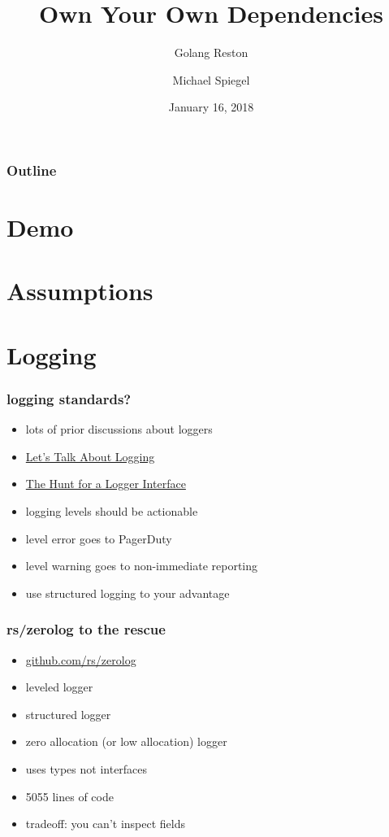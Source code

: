 \documentclass{beamer}
\title{Own Your Own Dependencies}
\subtitle{Golang Reston}
\author{Michael Spiegel}
\date{January 16, 2018}
\begin{document}
\begin{frame}
\titlepage
\end{frame}

\begin{frame}
\frametitle{Outline}
\tableofcontents
\end{frame}

\section{Demo}
\section{Assumptions}
\section{Logging}

\begin{frame}
\frametitle{logging standards?}
\begin{itemize}
\item lots of prior discussions about loggers
\item \href{https://dave.cheney.net/2015/11/05/lets-talk-about-logging}{Let's Talk About Logging}
\item \href{https://go-talks.appspot.com/github.com/ChrisHines/talks/structured-logging/structured-logging.slide}{The Hunt for a Logger Interface}
\item logging levels should be actionable
\item level error goes to PagerDuty
\item level warning goes to non-immediate reporting
\item use structured logging to your advantage
\end{itemize}
\end{frame}

\begin{frame}
\frametitle{rs/zerolog to the rescue}
\begin{itemize}
\item \href{https://github.com/rs/zerolog}{github.com/rs/zerolog}
\item leveled logger
\item structured logger
\item zero allocation (or low allocation) logger
\item uses types not interfaces
\item 5055 lines of code
\item tradeoff: you can't inspect fields
\end{itemize}
\end{frame}
\end{document}
